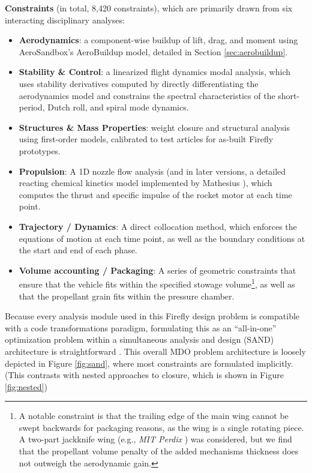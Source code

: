 \begin{example}
\begin{itemize}
        \textbf{Constraints} (in total, 8,420 constraints), which are primarily drawn from six interacting disciplinary analyses:
        \begin{itemize}
            \item \textbf{Aerodynamics}: a component-wise buildup of lift, drag, and moment using AeroSandbox's AeroBuildup model, detailed in Section \ref{sec:aerobuildup}.
            \item \textbf{Stability \& Control}: a linearized flight dynamics modal analysis, which uses stability derivatives computed by directly differentiating the aerodynamics model and constrains the spectral characteristics of the short-period, Dutch roll, and spiral mode dynamics.
            \item \textbf{Structures \& Mass Properties}: weight closure and structural analysis using first-order models, calibrated to test articles for as-built Firefly prototypes.
            \item \textbf{Propulsion}: A 1D nozzle flow analysis (and in later versions, a detailed reacting chemical kinetics model implemented by Mathesius \cite{mathesius_integrated_2023}), which computes the thrust and specific impulse of the rocket motor at each time point.
            \item \textbf{Trajectory / Dynamics}: A direct collocation method, which enforces the equations of motion at each time point, as well as the boundary conditions at the start and end of each phase.
            \item \textbf{Volume accounting / Packaging}: A series of geometric constraints that ensure that the vehicle fits within the specified stowage volume\footnote{A notable constraint is that the trailing edge of the main wing cannot be swept backwards for packaging reasons, as the wing is a single rotating piece. A two-part jackknife wing (e.g., \emph{MIT Perdix} \cite{tao_design_2012}) was considered, but we find that the propellant volume penalty of the added mechanisms thickness does not outweigh the aerodynamic gain.}, as well as that the propellant grain fits within the pressure chamber.
        \end{itemize}

    \end{itemize}

\end{example}

Because every analysis module used in this Firefly design problem is compatible with a code transformations paradigm, formulating this as an ``all-in-one'' optimization problem within a simultaneous analysis and design (SAND) architecture is straightforward \cite{haftka_simultaneous_1985, martins_multidisciplinary_2013}. This overall MDO problem architecture is loosely depicted in Figure \ref{fig:sand}, where most constraints are formulated implicitly. (This contrasts with nested approaches to closure, which is shown in Figure \ref{fig:nested})

